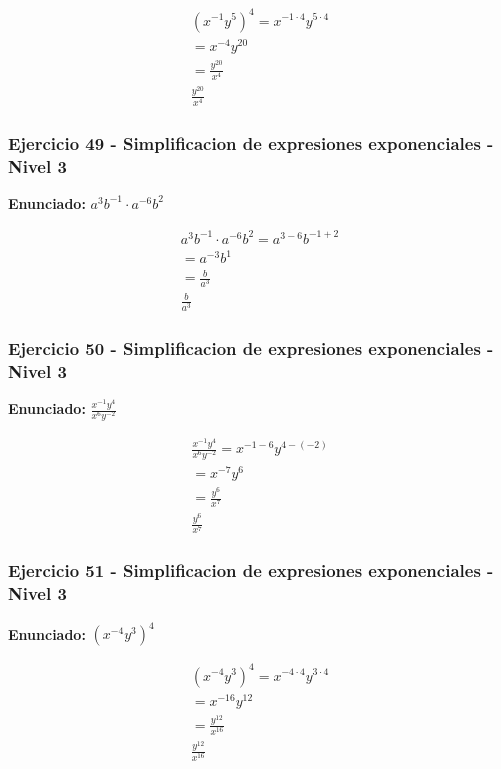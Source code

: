 \documentclass[12pt,a4paper]{article}
\begin{document}
\[
\begin{aligned}
\left(x^{-1}y^{5}\right)^{4}=x^{-1\cdot 4}y^{5\cdot 4}\\
=x^{-4}y^{20}\\
=\frac{y^{20}}{x^{4}}\\
\boxed{\frac{y^{20}}{x^{4}}}
\end{aligned}
\]


\subsubsection*{Ejercicio 49 - Simplificacion de expresiones exponenciales - Nivel 3}
\textbf{Enunciado:} \(a^{3}b^{-1}\cdot a^{-6}b^{2}\)

\[
\begin{aligned}
a^{3}b^{-1}\cdot a^{-6}b^{2}=a^{3-6}b^{-1+2}\\
=a^{-3}b^{1}\\
=\frac{b}{a^{3}}\\
\boxed{\frac{b}{a^{3}}}
\end{aligned}
\]


\subsubsection*{Ejercicio 50 - Simplificacion de expresiones exponenciales - Nivel 3}
\textbf{Enunciado:} \(\frac{x^{-1}y^{4}}{x^{6}y^{-2}}\)

\[
\begin{aligned}
\frac{x^{-1}y^{4}}{x^{6}y^{-2}}=x^{-1-6}y^{4-(-2)}\\
=x^{-7}y^{6}\\
=\frac{y^{6}}{x^{7}}\\
\boxed{\frac{y^{6}}{x^{7}}}
\end{aligned}
\]


\subsubsection*{Ejercicio 51 - Simplificacion de expresiones exponenciales - Nivel 3}
\textbf{Enunciado:} \(\left(x^{-4}y^{3}\right)^{4}\)

\[
\begin{aligned}
\left(x^{-4}y^{3}\right)^{4}=x^{-4\cdot 4}y^{3\cdot 4}\\
=x^{-16}y^{12}\\
=\frac{y^{12}}{x^{16}}\\
\boxed{\frac{y^{12}}{x^{16}}}
\end{aligned}
\]
\end{document}
